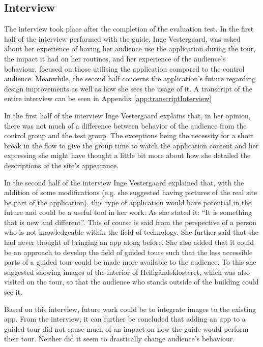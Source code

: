 \subsection{Interview}
The interview took place after the completion of the evaluation test. In the first half of the interview performed with the guide, Inge Vestergaard, was asked about her experience of having her audience use the application during the tour, the impact it had on her routines, and her experience of the audience’s behaviour, focused on those utilising the application compared to the control audience. Meanwhile, the second half concerns the application’s future regarding design improvements as well as how she sees the usage of it. A transcript of the entire interview can be seen in Appendix \ref{app:transcriptInterview}

In the first half of the interview Inge Vestergaard explains that, in her opinion, there was not much of a difference between behavior of the audience from the control group and the test group. The exceptions being the necessity for a short break in the flow to give the group time to watch the application content and her expressing she might have thought a little bit more about how she detailed the descriptions of the site’s appearance.     

In the second half of the interview Inge Vestergaard explained that, with the addition of some modifications (e.g. she suggested having pictures of the real site be part of the application), this type of application would have potential in the future and could be a useful tool in her work. As she stated it: “It is something that is new and different”. This of course is said from the perspective of a person who is not knowledgeable within the field of technology. She further said that she had never thought of bringing an app along before. She also added that it could be an approach to develop the field of guided tours such that the less accessible parts of a guided tour could be made more available to the audience. To this she suggested showing images of the interior of Helligåndsklosteret, which was also visited on the tour, so that the audience who stands outside of the building could see it.

Based on this interview, future work could be to integrate images to the existing app. From the interview, it can further be concluded that adding an app to a guided tour did not cause much of an impact on how the guide would perform their tour. Neither did it seem to drastically change audience’s behaviour. 

